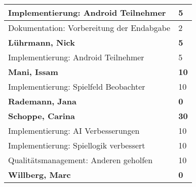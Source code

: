 \documentclass[a4paper,11pt]{scrartcl}
\begin{document}
\begin{longtable}{| p{13.8cm} | C{2.4cm} |}
  Implementierung: Android Teilnehmer
	&
  5
	\\
	\hline

  Dokumentation: Vorbereitung der Endabgabe
	&
  2
	\\
	\hline
	\hline


	\textbf{Lührmann, Nick} & \textbf{5}\\ %
	\hline

	Implementierung: Android Teilnehmer
	&
	5
	\\
	\hline
	\hline


	\textbf{Mani, Issam} & \textbf{10}\\ %
	\hline

  Implementierung: Spielfeld Beobachter
	&
  10
	\\
	\hline
	\hline


	\textbf{Rademann, Jana} & \textbf{0}\\ %
	\hline

	\hline
	\hline


	\textbf{Schoppe, Carina} & \textbf{30}\\ %
	\hline

  Implementierung: AI Verbesserungen
	&
  10
	\\
	\hline

  Implementierung: Spiellogik verbessert
	&
  10
	\\
	\hline

  Qualitätsmanagement: Anderen geholfen
	&
  10
	\\
	\hline
	\hline


	\textbf{Willberg, Marc} & \textbf{0}\\ %
	\hline

	\hline

\end{longtable}
\end{document}
